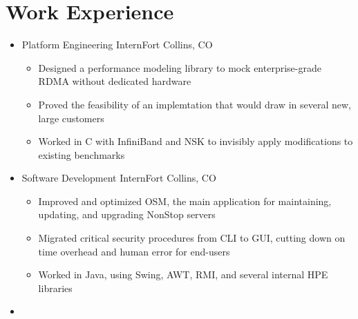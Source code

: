 \documentclass[10pt,letterpaper,sans]{moderncv}
\renewcommand{\_}{\textscale{.7}{\textunderscore}}
\newcommand{\Rplus}{\protect\hspace{-.1em}\protect\raisebox{.35ex}{\smaller{\smaller\textbf{+}}}}
\newcommand{\Cpp}{\mbox{C\Rplus\Rplus}\xspace}
\begin{document}
\section{Work Experience}
\begin{itemize}
\item{
  {Platform Engineering Intern}{Fort Collins, CO}{}{
    \begin{itemize}
    \item Designed a performance modeling library to mock enterprise-grade RDMA without dedicated hardware
    \item Proved the feasibility of an implemtation that would draw in several new, large customers
    \item Worked in \Cpp with InfiniBand and NSK to invisibly apply modifications to existing benchmarks
    \end{itemize}
}}
\item{
  {Software Development Intern}{Fort Collins, CO}{}{
    \begin{itemize}
    \item Improved and optimized OSM, the main application for maintaining, updating,
      and upgrading NonStop servers
    \item Migrated critical security procedures from CLI to GUI, cutting down on time
      overhead and human error for end-users
    \item Worked in Java, using Swing, AWT, RMI, and several internal HPE libraries
    \end{itemize}
}}
\item{}
\end{itemize}
\end{document}
